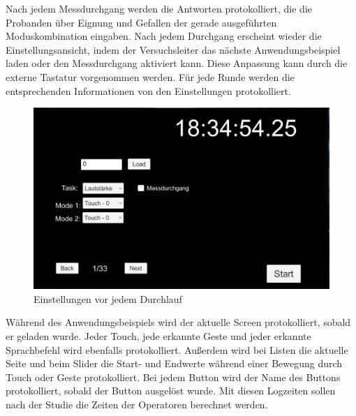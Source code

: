 Nach jedem Messdurchgang werden die Antworten protokolliert, die die Probanden über Eignung und Gefallen der gerade ausgeführten Moduskombination eingaben.
Nach jedem Durchgang erscheint wieder die Einstellungsansicht, indem der Versuchsleiter das nächste Anwendungsbeispiel laden oder den Messdurchgang aktiviert kann. Diese Anpassung kann durch die externe Tastatur vorgenommen werden.
Für jede Runde werden die entsprechenden Informationen von den Einstellungen protokolliert.
\begin{figure}[ht]
  \centering
  \includegraphics[width=1\textwidth]{img/SettingsPrototyp.jpg}
  \caption{Einstellungen vor jedem Durchlauf}
  \label{fig:ProbandenSettings}
\end{figure} 

Während des Anwendungsbeispiels wird der aktuelle Screen protokolliert, sobald er geladen wurde. 
Jeder Touch, jede erkannte Geste und jeder erkannte Sprachbefehl wird ebenfalls protokolliert. 
Außerdem wird bei Listen die aktuelle Seite und beim Slider die Start- und Endwerte während einer Bewegung durch Touch oder Geste protokolliert. 
Bei jedem Button wird der Name des Buttons protokolliert, sobald der Button ausgelöst wurde. 
Mit diesen Logzeiten sollen nach der Studie die Zeiten der Operatoren berechnet werden. 